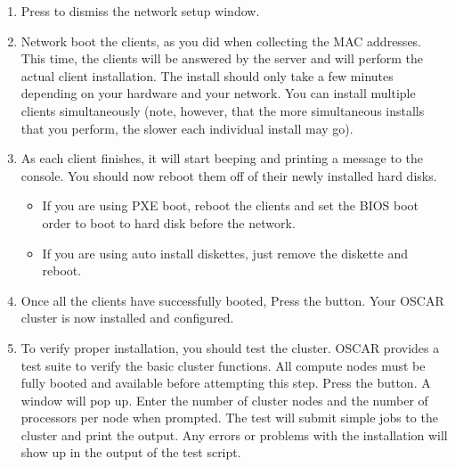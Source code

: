 \begin {enumerate}

\item Press  to dismiss the network setup window.
  
\item Network boot the clients, as you did when collecting the MAC
  addresses. This time, the clients will be answered by the server and
  will perform the actual client installation. The install should only
  take a few minutes depending on your hardware and your network.  You
  can install multiple clients simultaneously (note, however, that the
  more simultaneous installs that you perform, the slower each
  individual install may go).

  
\item As each client finishes, it will start beeping and printing a
  message to the console. You should now reboot them off of their
  newly installed hard disks.

  \begin{itemize}
  \item If you are using PXE boot, reboot the clients and set the BIOS
    boot order to boot to hard disk before the network.
  \item If you are using auto install diskettes, just remove the
    diskette and reboot.
  \end{itemize}

  
\item Once all the clients have successfully booted, Press the
   button. Your OSCAR cluster is now
  installed and configured.

  
\item To verify proper installation, you should test the cluster.
  OSCAR provides a test suite to verify the basic cluster functions.
  All compute nodes must be fully booted and available before
  attempting this step.  Press the  button.
  A window will pop up.  Enter the number of cluster nodes and the
  number of processors per node when prompted. The test will submit
  simple jobs to the cluster and print the output. Any errors or
  problems with the installation will show up in the output of the
  test script.


\end{enumerate}

